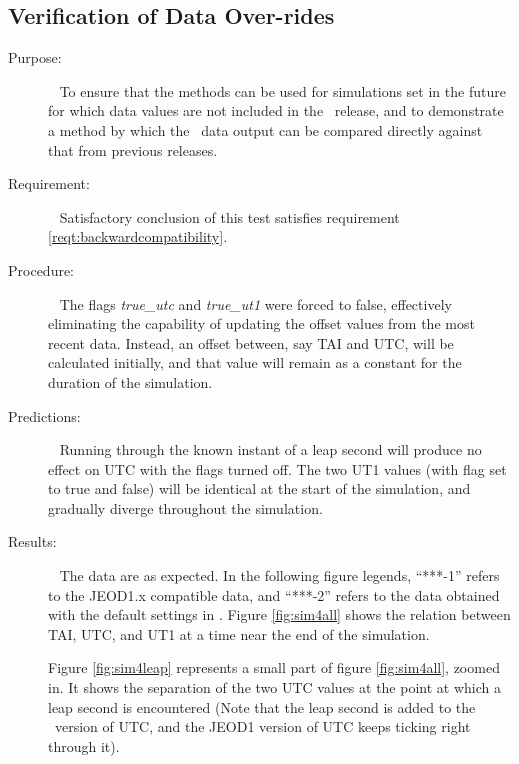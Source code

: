 \subsection{Verification of Data Over-rides}
  \label{test:overrides}
\begin{description}
\item[Purpose:]\ \newline
To ensure that the methods can be used for simulations set in the future for which data values are not included in the \JEODid\ release, and to demonstrate a method by which the \JEODid\ data output can be compared directly against that from previous releases.

\item[Requirement:]\ \newline
Satisfactory conclusion of this test satisfies requirement \ref{reqt:backwardcompatibility}.

\item[Procedure:]\ \newline
The flags \textit{true\_utc} and \textit{true\_ut1} were forced to false, effectively eliminating the capability of updating the offset values from the most recent data.  Instead, an offset between, say TAI and UTC, will be calculated initially, and that value will remain as a constant for the duration of the simulation.

\item[Predictions:]\ \newline
Running through the known instant of a leap second will produce no effect on UTC with the flags turned off.  The two UT1 values (with flag set to true and false) will be identical at the start of the simulation, and gradually diverge throughout the simulation.

\item[Results:]\ \newline
The data are as expected.
In the following figure legends, ``***-1'' refers to the JEOD1.x compatible
data, and ``***-2'' refers to the data obtained with the default settings in \JEODid.
Figure \ref{fig:sim4all} shows the relation between TAI, UTC, and UT1 at a time near the end of the simulation.  

Figure \ref{fig:sim4leap} represents a small part of figure \ref{fig:sim4all}, zoomed in. It shows the separation of the two UTC values at the point at which a leap second is encountered (Note that the leap second is added to the \JEODid\ version of UTC, and the JEOD1 version of UTC keeps ticking right through it).  


\end{description}
